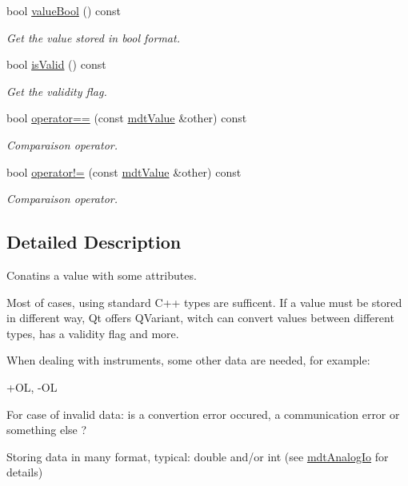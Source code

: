 \begin{DoxyCompactItemize}
bool \hyperlink{classmdt_value_acd0d628fdee31ce640f1bc76f3833173}{value\-Bool} () const 
\begin{DoxyCompactList}\small\item\em Get the value stored in bool format. \end{DoxyCompactList}\item 
bool \hyperlink{classmdt_value_a472996d8c32ce70e9332509151d6aed1}{is\-Valid} () const 
\begin{DoxyCompactList}\small\item\em Get the validity flag. \end{DoxyCompactList}\item 
bool \hyperlink{classmdt_value_acbb1e7472e9b6e105ba5ffe03476f4d4}{operator==} (const \hyperlink{classmdt_value}{mdt\-Value} \&other) const 
\begin{DoxyCompactList}\small\item\em Comparaison operator. \end{DoxyCompactList}\item 
bool \hyperlink{classmdt_value_a9d01fff18ab97a5f25d5f82655d42810}{operator!=} (const \hyperlink{classmdt_value}{mdt\-Value} \&other) const 
\begin{DoxyCompactList}\small\item\em Comparaison operator. \end{DoxyCompactList}\end{DoxyCompactItemize}


\subsection{Detailed Description}
Conatins a value with some attributes. 

Most of cases, using standard C++ types are sufficent. If a value must be stored in different way, Qt offers Q\-Variant, witch can convert values between different types, has a validity flag and more.

When dealing with instruments, some other data are needed, for example\-:
\begin{DoxyItemize}
\item +\-O\-L, -\/\-O\-L
\item For case of invalid data\-: is a convertion error occured, a communication error or something else ?
\item Storing data in many format, typical\-: double and/or int (see \hyperlink{classmdt_analog_io}{mdt\-Analog\-Io} for details)
\end{DoxyItemize}

